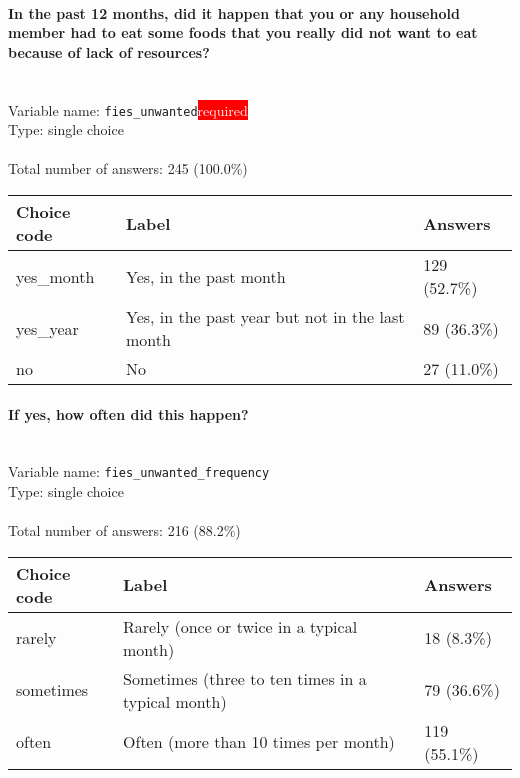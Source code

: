 \documentclass[11.5pt, a4paper]{scrartcl}
\begin{document}
\paragraph{In the past 12 months, did it happen that you or any household member had to eat some foods that you really did not want to eat because of lack of resources? }
\  \\Variable name: \texttt{fies\_unwanted}\hfill\colorbox{red}{\small{\textcolor{white}{required}}}\\
 Type: single choice\\
\\Total number of answers: 245 (100.0\%)
\\[0.2em] \begin{tabular}{p{4cm}|p{8cm}|p{3cm}}
Choice code & Label & Answers \\
\hline
yes\_month & Yes, in the past month& \cellcolor{color2}129 (52.7\%)\\
\cellcolor{mygray} yes\_year & \cellcolor{mygray}Yes, in the past year but not in the last month & \cellcolor{color1}89 (36.3\%)\\
no & No& \cellcolor{color0}27 (11.0\%)\\
\end{tabular}
\paragraph{If yes, how often did this happen? }
\  \\Variable name: \texttt{fies\_unwanted\_frequency}\\
Type: single choice\\
\\Total number of answers: 216 (88.2\%)
\\[0.2em] \begin{tabular}{p{4cm}|p{8cm}|p{3cm}}
Choice code & Label & Answers \\
\hline
rarely & Rarely (once or twice in a typical month)& \cellcolor{color0}18 (8.3\%)\\
\cellcolor{mygray} sometimes & \cellcolor{mygray}Sometimes (three to ten times in a typical month) & \cellcolor{color1}79 (36.6\%)\\
often & Often (more than 10 times per month)& \cellcolor{color2}119 (55.1\%)\\
\end{tabular}
\end{document}
